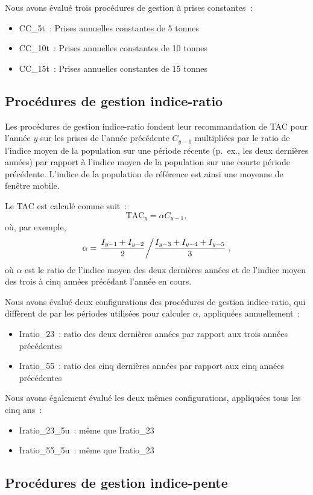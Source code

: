 \documentclass[11pt]{book}
\begin{document}
Nous avons évalué trois procédures de gestion à prises constantes~:
\begin{itemize}

\item
  CC\_5t~: Prises annuelles constantes de 5 tonnes
\item
  CC\_10t~: Prises annuelles constantes de 10 tonnes
\item
  CC\_15t~: Prises annuelles constantes de 15 tonnes
\end{itemize}
\hypertarget{sec:mp-ibased}{%
\label{sec:mp-ibased}}

\hypertarget{sec:mp-iratio}{%
\subsection{Procédures de gestion indice-ratio}\label{sec:mp-iratio}}

Les procédures de gestion indice-ratio fondent leur recommandation de TAC pour l'année \(y\) sur les prises de l'année précédente \(C_{y-1}\) multipliées par le ratio de l'indice moyen de la population sur une période récente (p.~ex., les deux dernières années) par rapport à l'indice moyen de la population sur une courte période précédente. L'indice de la population de référence est ainsi une moyenne de fenêtre mobile.

Le TAC est calculé comme suit~:
\begin{equation}
\textrm{TAC}_y = \alpha C_{y-1},
\end{equation}
où, par exemple,
\begin{equation}
\alpha =
\left. \frac{I_{y-1} + I_{y-2}} {2} \middle/
\frac{I_{y-3} + I_{y-4} + I_{y-5}} {3} \right. ,
\end{equation}
où \(\alpha\) est le ratio de l'indice moyen des deux dernières années et de l'indice moyen des trois à cinq années précédant l'année en cours.

Nous avons évalué deux configurations des procédures de gestion indice-ratio, qui diffèrent de par les périodes utilisées pour calculer \(\alpha\), appliquées annuellement~:
\begin{itemize}
\item
  Iratio\_23~: ratio des deux dernières années par rapport aux trois années précédentes
\item
  Iratio\_55~: ratio des cinq dernières années par rapport aux cinq années précédentes
\end{itemize}
Nous avons également évalué les deux mêmes configurations, appliquées tous les cinq ans~:
\begin{itemize}
\item
  Iratio\_23\_5u~: même que Iratio\_23
\item
  Iratio\_55\_5u~: même que Iratio\_23
\end{itemize}
\hypertarget{sec:mp-islope}{%
\subsection{Procédures de gestion indice-pente}\label{sec:mp-islope}}
\end{document}
